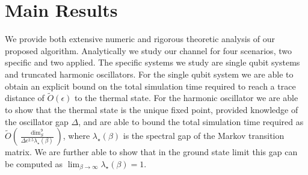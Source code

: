\documentclass[11pt]{article}
\newcommand{\bigotilde}[1]{\widetilde{O} \left( #1 \right)}
\begin{document}


\section{Main Results}
We provide both extensive numeric and rigorous theoretic analysis of our proposed algorithm. Analytically we study our channel for four scenarios, two specific and two applied. The specific systems we study are single qubit systems and truncated harmonic oscillators. For the single qubit system we are able to obtain an explicit bound on the total simulation time required to reach a trace distance of $\bigotilde{\epsilon}$ to the thermal state. For the harmonic oscillator we are able to show that the thermal state is the unique fixed point, provided knowledge of the oscillator gap $\Delta$, and are able to bound the total simulation time required as $\bigotilde{\frac{\dim_S^9}{\Delta \epsilon^{2.5} \lambda_\star(\beta) }}$, where $\lambda_\star(\beta)$ is the spectral gap of the Markov transition matrix. We are further able to show that in the ground state limit this gap can be computed as $\lim_{\beta \to \infty} \lambda_\star(\beta) = 1$. 
\end{document}
